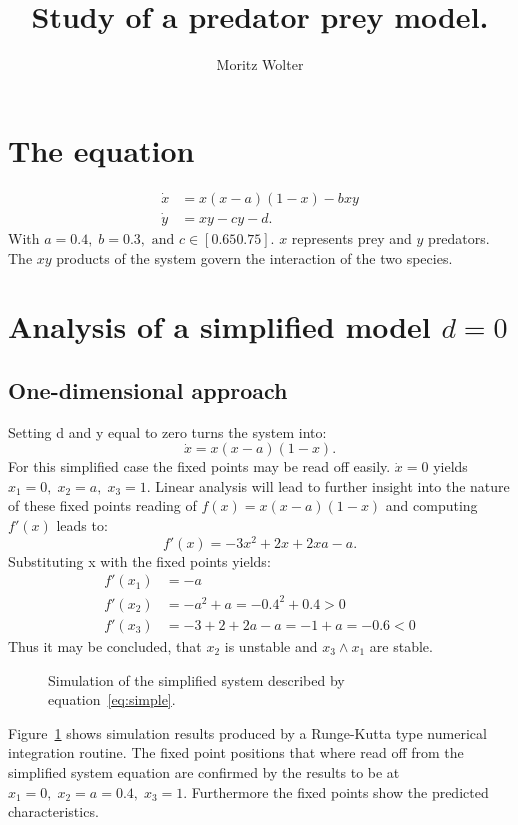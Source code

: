 




\title{Study of a predator prey model.}
\author{Moritz Wolter}

\maketitle

\section{The equation}
\begin{align}
\dot{x} &= x(x-a)(1-x) - bxy \\
\dot{y} &= xy - cy - d.
\label{eq:toBeAn}
\end{align}
With $a = 0.4, \; b = 0.3, \text{ and } c \in [0.65 0.75]$. $x$ represents prey and $y$ predators. The $xy$ products of the system govern the interaction of the two species. 

\section{Analysis of a simplified model $d=0$}
\subsection{One-dimensional approach}
Setting d and y equal to zero turns the system into:
\begin{equation}
\dot{x} = x(x-a)(1-x).
\label{eq:simple}
\end{equation}
For this simplified case the fixed points may be read off easily. $\dot{x} = 0$ yields $x_1 = 0, \; x_2 = a, \; x_3 = 1$. Linear analysis will lead to further insight into the nature of these fixed points reading of $f(x) =  x(x-a)(1-x)$ and computing $f'(x)$ leads to:
\begin{equation}
f'(x) = -3x^2 + 2x + 2xa -a.
\end{equation}
Substituting x with the fixed points yields:
\begin{align}
f'(x_1) &= -a \\
f'(x_2) &= -a^2 +a = -0.4^2 + 0.4 > 0 \\
f'(x_3) &= -3 + 2 + 2a - a = -1 + a = -0.6 < 0 
\end{align}
Thus it may be concluded, that $x_2$ is unstable and $x_3 \wedge x_1$ are stable.  
\begin{figure}
\centering

\caption{Simulation of the simplified system described by equation~\ref{eq:simple}.}
\label{fig:simpleSim}
\end{figure}
Figure~\ref{fig:simpleSim} shows simulation results produced by a Runge-Kutta type numerical integration routine. The fixed point positions that where read off from the simplified system equation are confirmed by the results to be at $x_1 = 0, \; x_2 = a = 0.4, \; x_3 = 1$. Furthermore the fixed points show the predicted characteristics.


